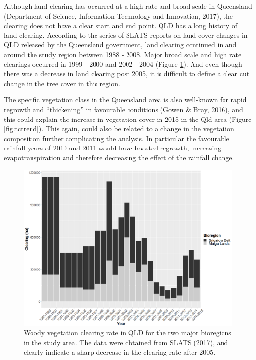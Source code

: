 \documentclass[fleqn,10pt,lineno]{wlpeerj} %
\theoremstyle{definition}
\theoremstyle{definition}
\theoremstyle{definition}
\theoremstyle{remark}
\begin{document}
Although land clearing has occurred at a high rate and broad scale in
Queensland (Department of Science, Information Technology and
Innovation, 2017), the clearing does not have a clear start and end
point. QLD has a long history of land clearing. According to the series
of SLATS reports on land cover changes in QLD released by the Queensland
government, land clearing continued in and around the study region
between 1988 - 2008. Major broad scale and high rate clearings occurred
in 1999 - 2000 and 2002 - 2004 (Figure \ref{fig:slat}). And even though
there was a decrease in land clearing post 2005, it is difficult to
define a clear cut change in the tree cover in this region.

The specific vegetation class in the Queensland area is also well-known
for rapid regrowth and ``thickening'' in favourable conditions (Gowen \&
Bray, 2016), and this could explain the increase in vegetation cover in
2015 in the Qld area (Figure \ref{fig:tctrend}). This again, could also
be related to a change in the vegetation composition further
complicating the analysis. In particular the favourable rainfall years
of 2010 and 2011 would have boosted regrowth, increasing
evapotranspiration and therefore decreasing the effect of the rainfall
change.

\begin{figure}
\includegraphics[width=0.9\linewidth]{figures/slats} \caption{Woody vegetation clearing rate in QLD for the two major bioregions in the study area. The data were obtained from SLATS (2017), and clearly indicate a sharp decrease in the clearing rate after 2005.}\label{fig:slat}
\end{figure}
\end{document}
